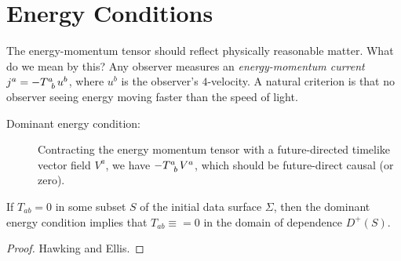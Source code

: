 \section{Energy Conditions}%
\label{sec:energy_conditions}

The energy-momentum tensor should reflect physically reasonable matter. What do we mean by this?
Any observer measures an \emph{energy-momentum current} $j^a = -T\indices{^{a}_{b}} u^b$, where $u^b$ is the observer's $4$-velocity.
A natural criterion is that no observer seeing energy moving faster than the speed of light.
\begin{description}
  \item[Dominant energy condition:]  Contracting the energy momentum tensor with a future-directed timelike vector field $V^a$, we have $-T\indices{^{a}_{b}} V^a$, which should be future-direct causal (or zero).
\end{description}

\begin{claim}
  If $T_{ab} = 0$ in some subset $S$ of the initial data surface $\Sigma$, then the dominant energy condition implies that $T_{ab} \equiv = 0$ in the domain of dependence $D^+(S)$.
\end{claim}
\begin{proof}
  Hawking and Ellis.
\end{proof}
